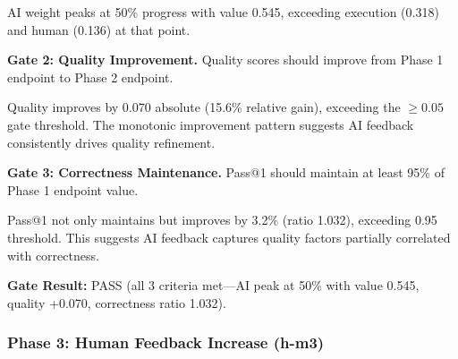 AI weight peaks at 50\% progress with value 0.545, exceeding execution (0.318) and human (0.136) at that point.

\textbf{Gate 2: Quality Improvement.} Quality scores should improve from Phase 1 endpoint to Phase 2 endpoint.

\begin{table}[htbp]
\centering
{}
\end{table}

Quality improves by 0.070 absolute (15.6\% relative gain), exceeding the $\geq 0.05$ gate threshold. The monotonic improvement pattern suggests AI feedback consistently drives quality refinement.

\textbf{Gate 3: Correctness Maintenance.} Pass@1 should maintain at least 95\% of Phase 1 endpoint value.

\begin{table}[htbp]
\centering
{}
\end{table}

Pass@1 not only maintains but improves by 3.2\% (ratio 1.032), exceeding 0.95 threshold. This suggests AI feedback captures quality factors partially correlated with correctness.

\textbf{Gate Result:} PASS (all 3 criteria met---AI peak at 50\% with value 0.545, quality +0.070, correctness ratio 1.032).

\subsubsection{Phase 3: Human Feedback Increase (h-m3)}

